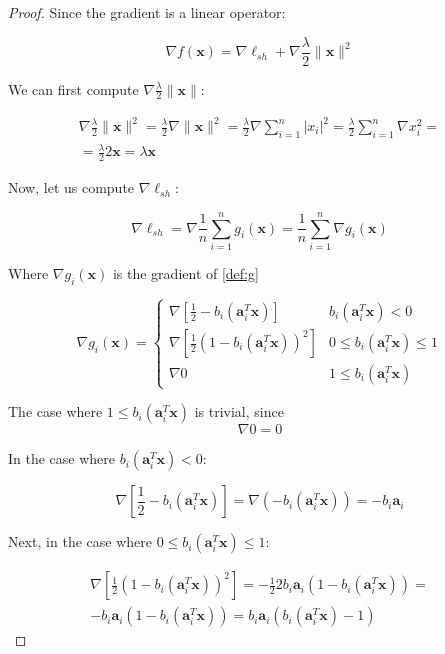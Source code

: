 \documentclass[12pt]{article}
\newcommand{\xb}{\mathbf{x}}
\newcommand{\ab}{\mathbf{a}}
\newcommand{\abi}{\ab_i}
\newcommand{\xnorm}{\lVert \mathbf{\xb} \rVert}
\newcommand{\sumin}{\sum_{i = 1}^n}
\newcommand{\ellsh}{\ell_{sh}}
\newcommand{\ax}{\abi^T\xb}
\newcommand{\fracn}{\frac{1}{n}}
\newcommand{\linearpred}{b_i(\ax) < 0}
\newcommand{\quadrpred}{0 \leq b_i(\ax) \leq 1}
\begin{document}
\begin{proof}
Since the gradient is a linear operator:

\begin{equation}
    \nabla f(\xb) = \nabla \ellsh + \nabla \frac{\lambda}{2} \xnorm ^ 2
\end{equation}

We can first compute $\nabla \frac{\lambda}{2} \xnorm$:

\begin{gather}
    \nabla \frac{\lambda}{2} \xnorm ^ 2 =
    \frac{\lambda}{2} \nabla \xnorm ^ 2 =
    \frac{\lambda}{2} \nabla \sumin |x_i|^2 = \nonumber
    \frac{\lambda}{2} \sumin \nabla x_i^2 = \\
     = \frac{\lambda}{2}2\xb =
    \lambda \xb \label{eq:grad_lambda}
\end{gather}

Now, let us compute $\nabla \ellsh$:

\begin{equation}
    \nabla \ellsh = \nabla \fracn \sumin g_i(\xb) = \fracn \sumin \nabla g_i(\xb)
\end{equation}

Where $\nabla g_i(\xb)$ is the gradient of \eqref{def:g}

\begin{equation}
    \nabla g_i(\xb) = \begin{cases}
        \nabla \left [\frac{1}{2} - b_i(\ax)\right]         & \linearpred \\
        \nabla \left [\frac{1}{2}(1 - b_i(\ax))^2\right]    & \quadrpred \\
        \nabla 0                                            & 1 \le b_i(\ax)
    \end{cases}
\end{equation}

The case where $1 \le b_i(\ax)$ is trivial, since
\begin{equation} \label{eq:grad_0_case}
    \nabla 0 = 0
\end{equation}

In the case where $\linearpred$:

\begin{equation} \label{eq:grad_linear_case}
    \nabla \left [\frac{1}{2} - b_i(\ax)\right] = \nabla (-b_i(\ax)) = -b_i\abi
\end{equation}

Next, in the case where $\quadrpred$:

\begin{gather}
    \nabla \left [\frac{1}{2}(1 - b_i(\ax))^2\right] = \nonumber
    -\frac{1}{2} 2 b_i\abi(1 - b_i(\ax)) = \\ \label{eq:grad_quadr_case}
    -b_i\abi(1 - b_i(\ax)) = b_i\abi(b_i(\ax) - 1)
\end{gather}


\end{proof}
\end{document}
